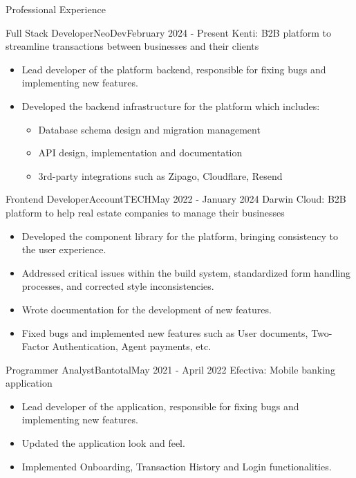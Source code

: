\documentclass[]{mcdowell-cv/mcdowellcv}
\begin{document}
    \begin{cvsection}{Professional Experience}
        \begin{cvsubsection}{Full Stack Developer}{NeoDev}{February 2024 - Present}
            Kenti: B2B platform to streamline transactions between businesses and their clients
            \begin{itemize}
                \item Lead developer of the platform backend,
                responsible for fixing bugs and implementing new features.
                \item Developed the backend infrastructure for the platform which includes:
                \begin{itemize}
                    \item Database schema design and migration management
                    \item API design, implementation and documentation
                    \item 3rd-party integrations such as Zipago, Cloudflare, Resend
                \end{itemize}
            \end{itemize}
        \end{cvsubsection}

        \begin{cvsubsection}{Frontend Developer}{AccountTECH}{May 2022 - January 2024}
            Darwin Cloud: B2B platform to help real estate companies to manage their businesses
            \begin{itemize}
                \item Developed the component library for the platform, bringing consistency to the user experience.
                \item Addressed critical issues within the build system,
                standardized form handling processes, and corrected style inconsistencies.
                \item Wrote documentation for the development of new features.
                \item Fixed bugs and implemented new features such as User documents,
                Two-Factor Authentication, Agent payments, etc.
            \end{itemize}
        \end{cvsubsection}

        \begin{cvsubsection}{Programmer Analyst}{Bantotal}{May 2021 - April 2022}
            Efectiva: Mobile banking application
            \begin{itemize}
                \item Lead developer of the application,
                responsible for fixing bugs and implementing new features.
                \item Updated the application look and feel.
                \item Implemented Onboarding, Transaction History and Login functionalities.
            \end{itemize}


\end{cvsubsection}
\end{cvsection}
\end{document}

